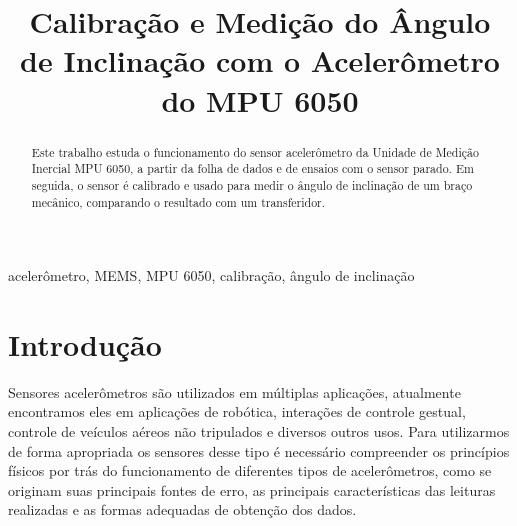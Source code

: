 \documentclass[conference]{IEEEtran}
\begin{document}
\title{Calibração e Medição do Ângulo de Inclinação com o Acelerômetro do MPU 6050}

\author{
\and
{}
}

\maketitle

\begin{abstract}
Este trabalho estuda o funcionamento do sensor acelerômetro da Unidade de Medição Inercial MPU 6050, a partir da folha de dados e de ensaios com o sensor parado. Em seguida, o sensor é calibrado e usado para medir o ângulo de inclinação de um braço mecânico, comparando o resultado com um transferidor.
\end{abstract}

\begin{IEEEkeywords}
acelerômetro, MEMS, MPU 6050, calibração, ângulo de inclinação
\end{IEEEkeywords}

\section{Introdução}
Sensores acelerômetros são utilizados em múltiplas aplicações, atualmente encontramos eles em aplicações de robótica, interações de controle gestual, controle de veículos aéreos não tripulados e diversos outros usos.
Para utilizarmos de forma apropriada os sensores desse tipo é necessário compreender os princípios físicos por trás do funcionamento de diferentes tipos de acelerômetros, como se originam suas principais fontes de erro, as principais características das leituras realizadas e as formas adequadas de obtenção dos dados.

\end{document}
